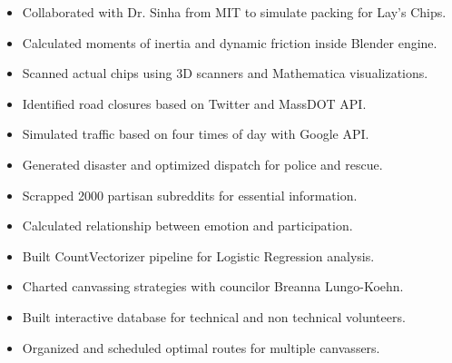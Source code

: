 \documentclass[10pt,letterpaper]{altacv}
\begin{document}

\begin{fullwidth}
\makecvheader
\end{fullwidth}


\smallskip

\begin{itemize}
\item Collaborated with Dr. Sinha from MIT to simulate packing for Lay's Chips.
\item Calculated moments of inertia and dynamic friction inside Blender engine. 
\item Scanned actual chips using 3D scanners and Mathematica visualizations.
\end{itemize}

\divider

\begin{itemize}
\item Identified road closures based on Twitter and MassDOT API.
\item Simulated traffic based on four times of day with Google API.
\item Generated disaster and optimized dispatch for police and rescue.
\end{itemize}

\divider

\begin{itemize}
\item Scrapped 2000 partisan subreddits for essential information.
\item Calculated relationship between emotion and participation.
\item Built CountVectorizer pipeline for Logistic Regression analysis.
\end{itemize}

\divider

\begin{itemize}
\item Charted canvassing strategies with councilor Breanna Lungo-Koehn. 
\item Built interactive database for technical and non technical volunteers. 
\item Organized and scheduled optimal routes for multiple canvassers. 
\end{itemize}
\end{document}

